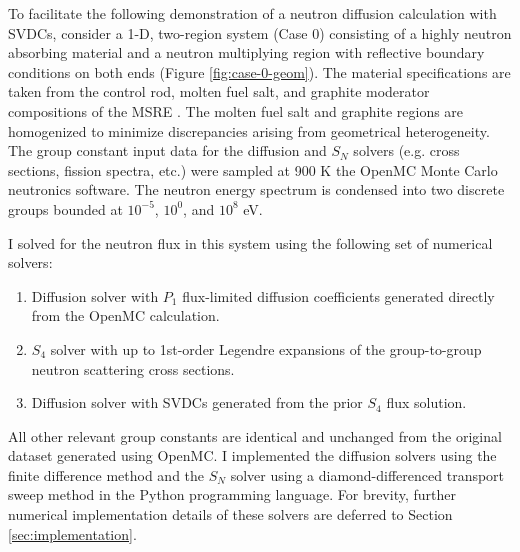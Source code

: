 To facilitate the following demonstration of a neutron diffusion calculation with \glspl{SVDC},
consider a 1-D, two-region system (Case 0) consisting of a highly neutron absorbing material and a
neutron multiplying region with reflective boundary conditions on both ends (Figure
\ref{fig:case-0-geom}). The material specifications are taken from the control rod, molten fuel
salt, and graphite moderator compositions of the \gls{MSRE} \cite{robertson_msre_1965}. The molten
fuel salt and graphite regions are homogenized to minimize discrepancies arising from geometrical
heterogeneity. The group constant input data for the diffusion and $S_N$ solvers (e.g. cross
sections, fission spectra, etc.) were sampled at 900 K the OpenMC Monte Carlo neutronics software.
The neutron energy spectrum is condensed into two discrete groups bounded at $10^{-5}$, $10^0$, and
$10^8$ eV.

I solved for the neutron flux in this system using the following set of numerical solvers:
%
\begin{enumerate}
  \item Diffusion solver with $P_1$ flux-limited diffusion coefficients generated directly from the
    OpenMC calculation.
  \item $S_4$ solver with up to 1st-order Legendre expansions of the group-to-group neutron
    scattering cross sections.
  \item Diffusion solver with \glspl{SVDC} generated from the prior $S_4$ flux solution.
\end{enumerate}
%
All other relevant group constants are identical and unchanged from the original dataset generated
using OpenMC. I implemented the diffusion solvers using the finite difference method and the $S_N$
solver using a diamond-differenced transport sweep method in the Python programming language. For
brevity, further numerical implementation details of these solvers are deferred to Section
\ref{sec:implementation}.

